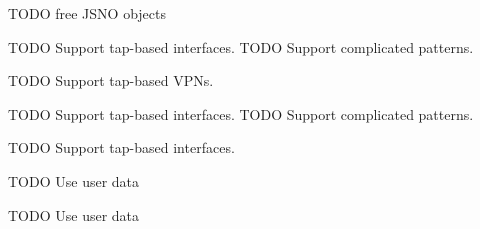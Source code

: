 \begin{DoxyRefList}
T\+O\+DO free J\+S\+NO objects 
\item[\label{todo__todo000011}%
\Hypertarget{todo__todo000011}%
Member \hyperlink{route-tree_8c_a8402c2baca9819b3791b35b6c1645ce6}{next\+\_\+hop\+\_\+entry\+\_\+cb} (struct rtnl\+\_\+nexthop $\ast$nh, void $\ast$data)]T\+O\+DO Support tap-\/based interfaces. T\+O\+DO Support complicated patterns. 
\item[\label{todo__todo000008}%
\Hypertarget{todo__todo000008}%
Member \hyperlink{main_8c_a9af8032bea78a008241c6a446021e90b}{public\+\_\+ip\+\_\+retrieve} ()]T\+O\+DO Support tap-\/based V\+P\+Ns. 
\item[\label{todo__todo000012}%
\Hypertarget{todo__todo000012}%
Member \hyperlink{route-tree_8c_a112b373b8e4a4a0eacfba3cc078e5ce2}{route\+\_\+entry\+\_\+cb} (struct nl\+\_\+object $\ast$obj, void $\ast$data)]T\+O\+DO Support tap-\/based interfaces. T\+O\+DO Support complicated patterns. 
\item[\label{todo__todo000007}%
\Hypertarget{todo__todo000007}%
Member \hyperlink{main_8c_a5e3d195dba2da8b65b35a85c7834dfa2}{traverse\+\_\+ifs} (struct ifaddrs $\ast$ifaddr, enum I\+F\+\_\+\+T\+R\+A\+V\+E\+R\+S\+E\+\_\+\+M\+O\+DE tr\+\_\+mode)]T\+O\+DO Support tap-\/based interfaces. 
\item[\label{todo__todo000004}%
\Hypertarget{todo__todo000004}%
Member \hyperlink{gnode-object_8c_acde5d3e413f355d1b912f0dcb9d4cdc1}{traverse\+\_\+json\+\_\+func} (G\+Node $\ast$node, gpointer data)]T\+O\+DO Use user data

T\+O\+DO Use user data
\end{DoxyRefList}